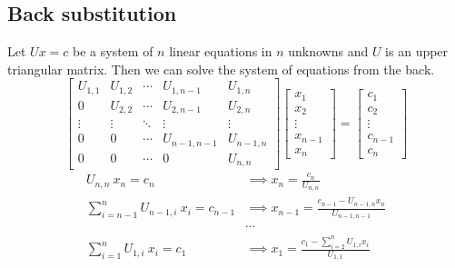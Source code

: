 

\subsection{Back substitution}
	Let $Ux = c$ be a system of $n$ linear equations in $n$ unknowns and $U$ is an upper triangular matrix. Then we can solve the system of equations from the back.
	\[ \begin{bmatrix} U_{1,1} & U_{1,2} & \cdots & U_{1,n-1} & U_{1,n} \\ 0 & U_{2,2} & \cdots & U_{2,n-1} & U_{2,n} \\ \vdots & \vdots & \ddots & \vdots & \vdots \\ 0 & 0 & \cdots & U_{n-1,n-1} & U_{n-1,n} \\ 0 & 0 & \cdots & 0 & U_{n,n} \end{bmatrix} \begin{bmatrix} x_1 \\ x_2 \\ \vdots \\ x_{n-1} \\ x_n \end{bmatrix} = \begin{bmatrix} c_1 \\ c_2 \\ \vdots \\ c_{n-1} \\ c_n \end{bmatrix} \]
	\begin{align*}
		U_{n,n}\ x_n = c_n & \implies x_n = \frac{c_n}{U_{n,n}} \\
		\sum_{i=n-1}^{n} U_{n-1,i}\ x_i = c_{n-1}  & \implies x_{n-1} = \frac{c_{n-1} - U_{n-1,n} x_n}{U_{n-1,n-1}} \\
		& \cdots \\
		\sum_{i=1}^n U_{1,i}\ x_i  = c_1 & \implies x_1 = \frac{c_1 - \sum_{i = 2}^{n} U_{1,i} x_i}{U_{1,1}}
	\end{align*}

